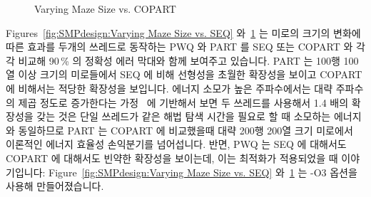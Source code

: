 \begin{figure}[tb]
\centering
{}
\caption{Varying Maze Size vs. COPART}
\label{fig:SMPdesign:Varying Maze Size vs. COPART}
\end{figure}

Figures~\ref{fig:SMPdesign:Varying Maze Size vs. SEQ}
와~\ref{fig:SMPdesign:Varying Maze Size vs. COPART} 는 미로의 크기의 변화에
따른 효과를 두개의 쓰레드로 동작하는 PWQ 와 PART 를 SEQ 또는 COPART 와 각각
비교해 90\,\% 의 정확성 에러 막대와 함께 보여주고 있습니다.
PART 는 100행 100열 이상 크기의 미로들에서 SEQ 에 비해 선형성을 초월한 확장성을
보이고 COPART 에 비해서는 적당한 확장성을 보입니다.
에너지 소모가 높은 주파수에서는 대략 주파수의 제곱 정도로 증가한다는
가정~\cite{TrevorMudge2000Power} 에 기반해서 보면 두 쓰레드를 사용해서 1.4 배의
확장성을 갖는 것은 단일 쓰레드가 같은 해법 탐색 시간을 필요로 할 때 소모하는
에너지와 동일하므로 PART 는 COPART 에 비교했을때 대략 200행 200열 크기 미로에서
이론적인 에너지 효율성 손익분기를 넘어섭니다.
반면, PWQ 는 SEQ 에 대해서도 COPART 에 대해서도 빈약한 확장성을 보이는데, 이는
최적화가 적용되었을 때 이야기입니다: Figure~\ref{fig:SMPdesign:Varying Maze
Size vs. SEQ}
와~\ref{fig:SMPdesign:Varying Maze Size vs. COPART} 는 -O3 옵션을 사용해
만들어졌습니다.
\iffalse

